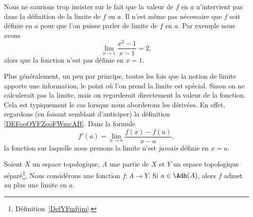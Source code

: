 \begin{remark}
	Nous ne saurions trop insister sur le fait que la valeur de \( f\) en \( a\) n'intervient pas dans la définition de la limite de \( f\) en \( a\). Il n'est même pas nécessaire que \( f\) soit définie en \( a\) pour que l'on puisse parler de limite de \( f\) en \( a\). Par exemple nous avons
	\begin{equation}
		\lim_{x\to 1} \frac{ x^2-1 }{ x-1 }=2,
	\end{equation}
	alors que la fonction n'est pas définie en \( x=1\).

	Plus généralement, un peu par principe, toutes les fois que la notion de limite apporte une information, le point où l'on prend la limite est spécial. Sinon on ne calculerait pas la limite, mais on regarderait directement la valeur de la fonction. Cela est typiquement le cas lorsque nous aborderons les dérivées. En effet, regardons (en faisant semblant d'anticiper) la définition  \eqref{DEFooOYFZooFWmcAB}. Dans la formule
	\begin{equation}
		f'(a)=\lim_{x\to a} \frac{ f(x)-f(a) }{ x-a },
	\end{equation}
	la fonction sur laquelle nous prenons la limite n'est \emph{jamais} définie en \( x=a\).
\end{remark}

\begin{proposition}\label{PropFObayrf}
	Soient \( X\) un espace topologique, \( A\) une partie de \( X\) et \( Y\) un espace topologique séparé\footnote{Définition~\ref{DefYFmfjjm}.}. Nous considérons une fonction \( f\colon A\to Y\). Si \( a\in \Adh(A)\), alors \( f\) admet au plus une limite en \( a\).
\end{proposition}

